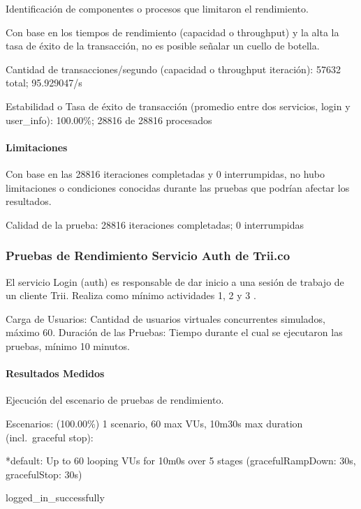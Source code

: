 \documentclass[
  paper=a4,
  ,captions=tableheading
]{scrartcl}
\renewenvironment{quote}{\begin{customblockquote}\list{}{\rightmargin=0em\leftmargin=0em}%
\item\relax\color{blockquote-text}\ignorespaces}{\unskip\unskip\endlist\end{customblockquote}}
\begin{document}
Identificación de componentes o procesos que limitaron el rendimiento.

Con base en los tiempos de rendimiento (capacidad o throughput) y la
alta la tasa de éxito de la transacción, no es posible señalar un cuello
de botella.

\begin{quote}
Cantidad de transacciones/segundo (capacidad o throughput iteración):
57632 total; 95.929047/s

Estabilidad o Tasa de éxito de transacción (promedio entre dos
servicios, login y user\_info): 100.00\%; 28816 de 28816 procesados
\end{quote}

\paragraph{Limitaciones}\label{sec:limitaciones}

Con base en las 28816 iteraciones completadas y 0 interrumpidas, no hubo
limitaciones o condiciones conocidas durante las pruebas que podrían
afectar los resultados.

\begin{quote}
Calidad de la prueba: 28816 iteraciones completadas; 0 interrumpidas
\end{quote}

\subsubsection{Pruebas de Rendimiento Servicio Auth de
Trii.co}\label{sec:pruebas-de-rendimiento-servicio-auth-de-trii.co}

El servicio Login (auth) es responsable de dar inicio a una sesión de
trabajo de un cliente Trii. Realiza como mínimo actividades 1, 2 y 3 .

Carga de Usuarios: Cantidad de usuarios virtuales concurrentes
simulados, máximo 60. Duración de las Pruebas: Tiempo durante el cual se
ejecutaron las pruebas, mínimo 10 minutos.

\paragraph{Resultados Medidos}\label{sec:resultados-medidos-1}

Ejecución del escenario de pruebas de rendimiento.

\begin{quote}
Escenarios: (100.00\%) 1 scenario, 60 max VUs, 10m30s max duration
(incl.~graceful stop):

*default: Up to 60 looping VUs for 10m0s over 5 stages
(gracefulRampDown: 30s, gracefulStop: 30s)

logged\_in\_successfully
\end{quote}
\end{document}
